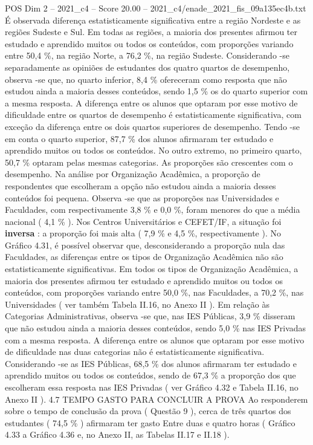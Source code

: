 \begin{textsample}{POS Dim 2 – 2021\_c4 – Score 20.00 – 2021\_c4/enade\_2021\_fis\_09a135ec4b.txt}
É observada diferença estatisticamente significativa entre a região Nordeste e as regiões Sudeste e Sul.
Em todas as regiões, a maioria dos presentes afirmou ter estudado e aprendido muitos ou todos os conteúdos, com proporções variando entre 50,4 \%, na região Norte, a 76,2 \%, na região Sudeste.
Considerando -se separadamente as opiniões de estudantes dos quatro quartos de desempenho, observa -se que, no quarto inferior, 8,4 \% ofereceram como resposta que não estudou ainda a maioria desses conteúdos, sendo 1,5 \% os do quarto superior com a mesma resposta.
A diferença entre os alunos que optaram por esse motivo de dificuldade entre os quartos de desempenho é estatisticamente significativa, com exceção da diferença entre os dois quartos superiores de desempenho.
Tendo -se em conta o quarto superior, 87,7 \% dos alunos afirmaram ter estudado e aprendido muitos ou todos os conteúdos.
No outro extremo, no primeiro quarto, 50,7 \% optaram pelas mesmas categorias.
As proporções são crescentes com o desempenho.
Na análise por Organização Acadêmica, a proporção de respondentes que escolheram a opção não estudou ainda a maioria desses conteúdos foi pequena.
Observa -se que as proporções nas Universidades e Faculdades, com respectivamente 3,8 \% e 0,0 \%, foram menores do que a média nacional ( 4,1 \% ).
Nos Centros Universitários e CEFET/IF, a situação foi \textbf{inversa} : a proporção foi mais alta ( 7,9 \% e 4,5 \%, respectivamente ).
No Gráfico 4.31, é possível observar que, desconsiderando a proporção nula das Faculdades, as diferenças entre os tipos de Organização Acadêmica não são estatisticamente significativas.
Em todos os tipos de Organização Acadêmica, a maioria dos presentes afirmou ter estudado e aprendido muitos ou todos os conteúdos, com proporções variando entre 50,0 \%, nas Faculdades, a 70,2 \%, nas Universidades ( ver também Tabela II.16, no Anexo II ).
Em relação às Categorias Administrativas, observa -se que, nas IES Públicas, 3,9 \% disseram que não estudou ainda a maioria desses conteúdos, sendo 5,0 \% nas IES Privadas com a mesma resposta.
A diferença entre os alunos que optaram por esse motivo de dificuldade nas duas categorias não é estatisticamente significativa.
Considerando -se as IES Públicas, 68,5 \% dos alunos afirmaram ter estudado e aprendido muitos ou todos os conteúdos, sendo de 67,3 \% a proporção dos que escolheram essa resposta nas IES Privadas ( ver Gráfico 4.32 e Tabela II.16, no Anexo II ). 4.7 TEMPO GASTO PARA CONCLUIR A PROVA Ao responderem sobre o tempo de conclusão da prova ( Questão 9 ), cerca de três quartos dos estudantes ( 74,5 \% ) afirmaram ter gasto Entre duas e quatro horas ( Gráfico 4.33 a Gráfico 4.36 e, no Anexo II, as Tabelas II.17 e II.18 ).

\end{textsample}

